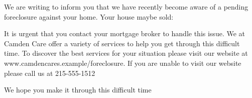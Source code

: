 \begin{newlfm}

We are writing to inform you that we have recently become aware of a pending foreclosure against your home. Your house maybe sold: 

It is urgent that you contact your mortgage broker to handle this issue.
We at Camden Care offer a variety of services to help you get through this difficult time. To discover the best services for your situation please visit our website at www.camdencares.example/foreclosure.
If you are unable to visit our website please call us at 215-555-1512

We hope you make it through this difficult time

\end{newlfm}
\pagebreak

